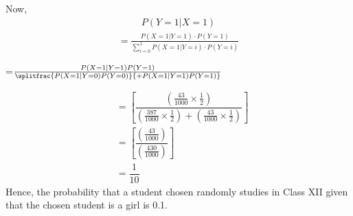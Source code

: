 \documentclass[journal,12pt,two column]{IEEEtran}
\begin{document}
Now,
\begin{align}
P(Y=1 \vert X=1)    
\end{align}
\begin{align}    
=\frac{P(X=1\vert Y=1)\cdot P(Y=1)}{\sum_{i=0}^{1} P(X=1\vert Y=i)\cdot P(Y=i)}
\end{align}
\begin{center} 
=$\frac{P(X=1 \vert Y=1)P(Y=1)}{\splitfrac{P(X=1\vert Y=0)P(Y=0)}{+P(X=1\vert Y=1)P(Y=1)}}$
\end{center}
\begin{align}
&=\left[ \dfrac{\left( \frac{43}{1000}\times \frac{1}{2}\right)}{\left( \frac{387}{1000}\times \frac{1}{2} \right) + \left( \frac{43}{1000}\times \frac{1}{2} \right)}\right]\\
&=\left[ \dfrac{\left( \frac{43}{1000} \right)}{\left( \frac{430}{1000} \right)}\right]\\ 
&=\dfrac{1}{10} 
\end{align}
Hence, the probability that a student chosen randomly studies in Class XII given that the chosen student is a girl is 0.1.
\end{document}
